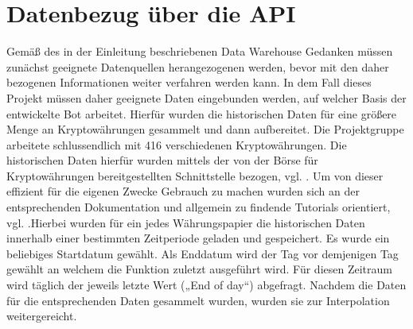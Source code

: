 \section{Datenbezug über die API}

Gemäß des in der Einleitung beschriebenen Data Warehouse Gedanken müssen zunächst geeignete Datenquellen herangezogenen werden, bevor mit den daher bezogenen Informationen weiter verfahren werden kann. In dem Fall dieses Projekt müssen daher geeignete Daten eingebunden werden, auf welcher Basis der entwickelte Bot arbeitet. Hierfür wurden die historischen Daten für eine größere Menge an Kryptowährungen gesammelt und dann aufbereitet. Die Projektgruppe arbeitete schlussendlich mit 416 verschiedenen Kryptowährungen. Die historischen Daten hierfür wurden mittels der von der Börse für Kryptowährungen bereitgestellten Schnittstelle bezogen, vgl. \cite{bitfinex}. Um von dieser effizient für die eigenen Zwecke Gebrauch zu machen wurden sich an der entsprechenden Dokumentation und allgemein zu findende Tutorials orientiert, vgl. \cite{kaggle}.\newline Hierbei wurden für ein jedes Währungspapier die historischen Daten innerhalb einer bestimmten Zeitperiode geladen und gespeichert. Es wurde ein beliebiges Startdatum gewählt. Als Enddatum wird der Tag vor demjenigen Tag gewählt an welchem die Funktion zuletzt ausgeführt wird. Für diesen Zeitraum wird täglich der jeweils letzte Wert („End of day“) abgefragt. Nachdem die Daten für die entsprechenden Daten gesammelt wurden, wurden sie zur Interpolation weitergereicht.